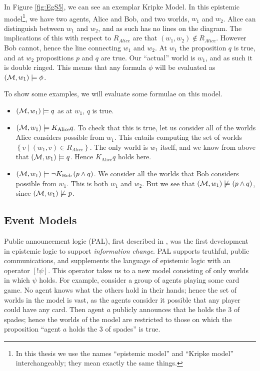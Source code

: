 \documentclass[10pt, a4paper]{report}
\begin{document}
In Figure \ref{fig:EgS5}, we can see an exemplar Kripke Model. In this epistemic
model\footnote{In this thesis we use the names ``epistemic model'' and ``Kripke
  model'' interchangeably; they mean exactly the same things.}, we have two
agents, Alice and Bob, and two worlds, $w_1$ and $w_2$. Alice can distinguish
between $w_1$ and $w_2$, and as such has no lines on the diagram. The
implications of this with respect to $R_{Alice}$ are that $(w_1, w_2) \not \in
R_{Alice}$. However Bob cannot, hence the line connecting $w_1$ and $w_2$. At
$w_1$ the proposition $q$ is true, and at $w_2$ propositions $p$ and $q$ are
true. Our ``actual'' world is $w_1$, and as such it is double ringed. This means
that any formula $\phi$ will be evaluated as $(\mathcal{M}, w_1) \models \phi$.

To show some examples, we will evaluate some formulae on this model.

\begin{itemize}
\item $(\mathcal{M}, w_1) \models q$ as at $w_1$, $q$ is true.
\item $(\mathcal{M}, w_1) \models K_{\text{Alice}} q$. To check that this is true,
  let us consider all of the worlds Alice considers possible from $w_1$. This
  entails computing the set of worlds $\left\{ v \mid (w_1, v) \in R_{Alice}
  \right\}$. The only world is $w_1$ itself, and we know from above that
  $(\mathcal{M}, w_1) \models q$. Hence $K_{\text{Alice}} q$ holds here.
\item $(\mathcal{M}, w_1) \models \neg K_{\text{Bob}} \left( p \land q \right)$. We
  consider all the worlds that Bob considers possible from $w_1$. This is both
  $w_1$ and $w_2$. But we see that $(\mathcal{M}, w_1) \not \models (p \land q)$,
  since $(\mathcal{M}, w_1) \not \models p$.
\end{itemize}

\subsection{Event Models}
\label{sec:Event Models}

Public announcement logic (PAL), first described in \cite{PAL}, was the first
development in epistemic logic to support \emph{information change}. PAL
supports truthful, public communications, and supplements the language of
epistemic logic with an operator $[!\psi]$. This operator takes us to a new
model consisting of only worlds in which $\psi$ holds. For example, consider a
group of agents playing some card game. No agent knows what the others hold in
their hands; hence the set of worlds in the model is vast, as the agents
consider it possible that any player could have any card. Then agent $a$
publicly announces that he holds the 3 of spades; hence the worlds of the model
are restricted to those on which the proposition ``agent $a$ holds the 3 of
spades'' is true.
\end{document}
